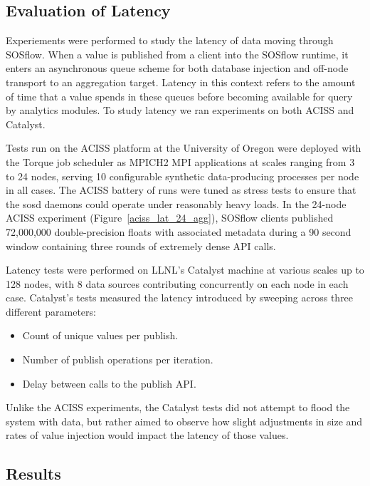 \subsection{Evaluation of Latency} %
Experiements were performed to study the latency of data moving
through SOSflow.
%
When a value is published from a client into the SOSflow runtime,
it enters an asynchronous queue scheme for both database injection
and off-node transport to an aggregation target.
%
Latency in this context refers to the amount of time that a value
spends in these queues before becoming available for query by
analytics modules.
%
To study latency we ran experiments on both ACISS and Catalyst.
% 
\par
%
Tests run on the ACISS platform at the University of Oregon were
deployed with the Torque job scheduler as MPICH2 MPI applications at
scales ranging from 3 to 24 nodes, serving 10 configurable synthetic
data-producing processes per node in all cases.
%
The ACISS battery of runs were tuned as stress tests to ensure that
the sosd daemons could operate under reasonably heavy loads.
%
In the 24-node ACISS experiment (Figure~\ref{aciss_lat_24_agg}),
SOSflow clients published 72,000,000 double-precision floats
with associated metadata during a 90 second window containing three
rounds of extremely dense API calls.
%
\par
%
Latency tests were performed on LLNL's Catalyst machine at
various scales up to 128 nodes, with 8 data sources contributing
concurrently on each node in each case.
%
Catalyst's tests measured the latency introduced by sweeping across three
different parameters:
\begin{itemize}
\item Count of unique values per publish.
\item Number of publish operations per iteration.
\item Delay between calls to the publish API.
\end{itemize}
%
Unlike the ACISS experiments, the Catalyst tests did not attempt to
flood the system with data, but rather aimed to observe how slight
adjustments in size and rates of value injection would impact the
latency of those values.
%
%




\subsection{Results} %
%
%
